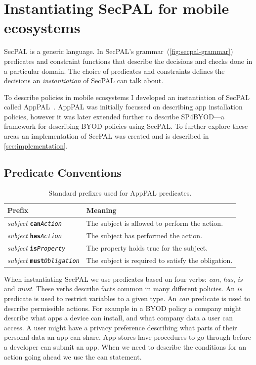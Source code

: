 \documentclass[thesis.tex]{subfiles}
\begin{document}
\section{Instantiating SecPAL for mobile ecosystems}
\label{sec:instantiating}

SecPAL is a generic language.
In SecPAL's grammar~(\autoref{fig:secpal-grammar}) predicates and constraint functions that describe the decisions and checks done in a particular domain.
The choice of predicates and constraints defines the decisions an \emph{instantiation} of SecPAL can talk about.

To describe policies in mobile ecosystems I developed an instantiation of SecPAL called AppPAL~\cite{hallett_apppal_2016}.
AppPAL was initially focussed on describing app installation policies, however it was later extended further to describe SP4BYOD---a framework for describing BYOD policies using SecPAL.
To further explore these areas an implementation of SecPAL was created and is described in \autoref{sec:implementation}.

\subsection{Predicate Conventions}
\label{ssec:types}

\newcommand{\descPred}[2]{\emph{subject} \texttt{\textbf{#1}\emph{#2}}}
\begin{table}
  \begin{tabular}{l l}
    \toprule
    Prefix                      & Meaning                                            \\
    \midrule
    \descPred{can}{Action}      & The subject is allowed to perform the action.      \\
    \descPred{has}{Action}      & The subject has performed the action.              \\
    \descPred{is}{Property}     & The property holds true for the subject.           \\
    \descPred{must}{Obligation} & The subject is required to satisfy the obligation. \\
    \bottomrule
  \end{tabular}
  \caption{Standard prefixes used for AppPAL predicates.}
  \label{tab:predicate-prefixes}
\end{table}

When instantiating SecPAL we use predicates based on four verbs: \emph{can}, \emph{has}, \emph{is} and \emph{must}.
These verbs describe facts common in many different policies.
An \emph{is} predicate is used to restrict variables to a given type.
An \emph{can} predicate is used to describe permissible actions.
For example in a \ac{BYOD} policy a company might describe what apps a device can install, and what company data a user can access.
A user might have a privacy preference describing what parts of their personal data an app can share.
App stores have procedures to go through before a developer can submit an app. 
When we need to describe the conditions for an action going ahead we use the can statement.
\end{document}
